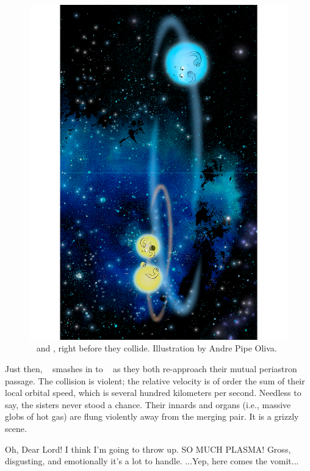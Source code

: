 \documentclass[main.tex]{subfiles}
\begin{document}
\begin{figure}
\includegraphics[width=\columnwidth,angle=270,origin=c]{ch3_2.pdf}
\caption{\rmtaygete~ and \rmalcyone, right before they collide.  Illustration by Andre Pipe Oliva. 
\label{fig:fig1}}
\end{figure}

\par \nar Just then, \rmtaygete~ smashes in to \rmalcyone~ as they both re-approach their mutual periastron passage.  The collision is violent; the relative velocity is of order the sum of their local orbital speed, which is several hundred kilometers per second.  Needless to say, the sisters never stood a chance.  Their innards and organs (i.e., massive globs of hot gas) are flung violently away from the merging pair.  It is a grizzly scene.

\par \Celaeno Oh, Dear Lord!  I think I'm going to throw up.  SO MUCH PLASMA!  Gross, disgusting, and emotionally it's a lot to handle. ...Yep, here comes the vomit...
\end{document}
